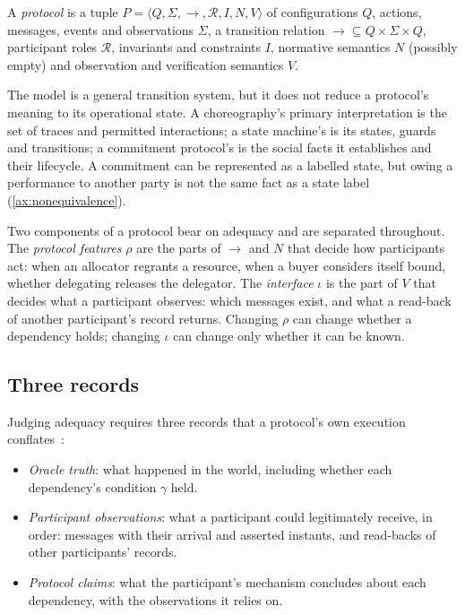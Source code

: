\begin{definition}[Protocol]
\label{def:protocol}
A \emph{protocol} is a tuple $P = \langle Q, \Sigma, \longrightarrow, \mathcal{R}, I, N, V \rangle$ of configurations $Q$, actions, messages, events and observations $\Sigma$, a transition relation ${\longrightarrow} \subseteq Q \times \Sigma \times Q$, participant roles $\mathcal{R}$, invariants and constraints $I$, normative semantics $N$ (possibly empty) and observation and verification semantics $V$.
\end{definition}

The model is a general transition system, but it does not reduce a protocol's meaning to its operational state. A choreography's primary interpretation is the set of traces and permitted interactions; a state machine's is its states, guards and transitions; a commitment protocol's is the social facts it establishes and their lifecycle. A commitment can be represented as a labelled state, but owing a performance to another party is not the same fact as a state label (\cref{ax:nonequivalence}).

Two components of a protocol bear on adequacy and are separated throughout. The \emph{protocol features} $\rho$ are the parts of $\longrightarrow$ and $N$ that decide how participants act: when an allocator regrants a resource, when a buyer considers itself bound, whether delegating releases the delegator. The \emph{interface} $\iota$ is the part of $V$ that decides what a participant observes: which messages exist, and what a read-back of another participant's record returns. Changing $\rho$ can change whether a dependency holds; changing $\iota$ can change only whether it can be known.

\subsection{Three records}

Judging adequacy requires three records that a protocol's own execution conflates~\cite{w3c2013provo}:

\begin{itemize}
\item \emph{Oracle truth}: what happened in the world, including whether each dependency's condition $\gamma$ held.
\item \emph{Participant observations}: what a participant could legitimately receive, in order: messages with their arrival and asserted instants, and read-backs of other participants' records.
\item \emph{Protocol claims}: what the participant's mechanism concludes about each dependency, with the observations it relies on.
\end{itemize}

